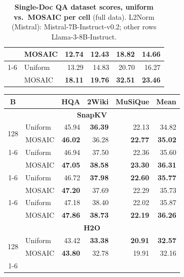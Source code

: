 \begin{table}[tp]
\begin{tabular}{@{} c l rrrr @{}}
     & MOSAIC & \textbf{12.74} & \textbf{12.43} & \textbf{18.82} & \textbf{14.66} \\
    \cmidrule(l){1-6}
    \multirow{2}{*}{1024} & Uniform & 13.29 & 14.83 & 20.70 & 16.27 \\
     & MOSAIC & \textbf{18.11} & \textbf{19.76} & \textbf{32.51} & \textbf{23.46} \\
    \bottomrule
  \end{tabular}
  \caption{\textbf{Single-Doc QA dataset scores, uniform vs.\ MOSAIC per cell} (full data). L2Norm (Mistral): Mistral-7B-Instruct-v0.2; other rows Llama-3-8B-Instruct.}
  \label{tab:app-lb-SINGLE_DOCUMENT_QA}
\end{table}

\begin{table}[tp]
  \centering
  \scriptsize
  \setlength{\tabcolsep}{5pt}
  \renewcommand{\arraystretch}{0.92}
  \begin{tabular}{@{} c l rrrr @{}}
    \toprule
    \textbf{B} & & \textbf{HQA} & \textbf{2Wiki} & \textbf{MuSiQue} & \textbf{Mean} \\
    \midrule
    \multicolumn{6}{c}{\textbf{SnapKV}} \\
    \midrule
    \multirow{2}{*}{128} & Uniform & 45.94 & \textbf{36.39} & 22.13 & 34.82 \\
     & MOSAIC & \textbf{46.02} & 36.28 & \textbf{22.77} & \textbf{35.02} \\
    \cmidrule(l){1-6}
    \multirow{2}{*}{256} & Uniform & 46.94 & 37.50 & 22.36 & 35.60 \\
     & MOSAIC & \textbf{47.05} & \textbf{38.58} & \textbf{23.30} & \textbf{36.31} \\
    \cmidrule(l){1-6}
    \multirow{2}{*}{512} & Uniform & 46.72 & \textbf{37.98} & \textbf{22.60} & \textbf{35.77} \\
     & MOSAIC & \textbf{47.20} & 37.69 & 22.29 & 35.73 \\
    \cmidrule(l){1-6}
    \multirow{2}{*}{1024} & Uniform & 47.18 & 38.40 & 22.02 & 35.87 \\
     & MOSAIC & \textbf{47.86} & \textbf{38.73} & \textbf{22.19} & \textbf{36.26} \\
    \midrule
    \multicolumn{6}{c}{\textbf{H2O}} \\
    \midrule
    \multirow{2}{*}{128} & Uniform & 43.42 & \textbf{33.38} & \textbf{20.91} & \textbf{32.57} \\
     & MOSAIC & \textbf{43.80} & 32.78 & 19.91 & 32.16 \\
    \cmidrule(l){1-6}

\end{tabular}
\end{table}
